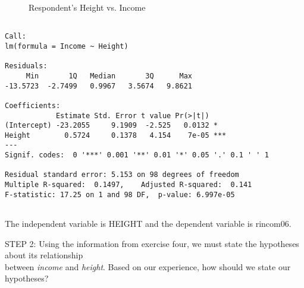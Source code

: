 \documentclass[11pt]{book}\usepackage[]{graphicx}\usepackage[]{color}
\begin{document}
\begin{exercises}
\begin{exercise}
\begin{figure}[ht]
{}

\caption[Respondent's Height vs]{Respondent's Height vs. Income}\label{fig:LBL16h}
\end{figure}



{\tiny{
  \begin{verbatim}

Call:
lm(formula = Income ~ Height)

Residuals:
     Min       1Q   Median       3Q      Max 
-13.5723  -2.7499   0.9967   3.5674   9.8621 

Coefficients:
            Estimate Std. Error t value Pr(>|t|)    
(Intercept) -23.2055     9.1909  -2.525   0.0132 *  
Height        0.5724     0.1378   4.154    7e-05 ***
---
Signif. codes:  0 '***' 0.001 '**' 0.01 '*' 0.05 '.' 0.1 ' ' 1

Residual standard error: 5.153 on 98 degrees of freedom
Multiple R-squared:  0.1497,	Adjusted R-squared:  0.141 
F-statistic: 17.25 on 1 and 98 DF,  p-value: 6.997e-05


  \end{verbatim}
}}

    \vspace{5mm}

    \end{exercise}
    \begin{solution}    %

       The independent variable is HEIGHT and the dependent variable is rincom06.

    \end{solution}

  \begin{exercise} %

    STEP 2: Using the information from exercise four, we must state the hypotheses about its relationship \\ between {\textit{income}} and {\textit{height}}.  Based on our experience, how should we state our hypotheses?

    \vspace{5mm}

    \end{exercise}

  \begin{exercise} %


\end{exercise}
\end{exercises}
\end{document}
